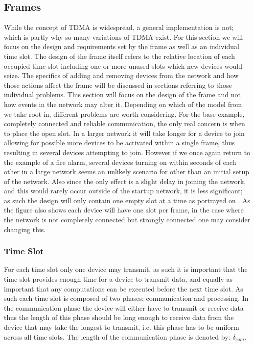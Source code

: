 \subsection{Frames}\label{GCRC:frame}
While the concept of TDMA is widespread, a general implementation is not; which is partly why so many variations of TDMA exist.
For this section we will focus on the design and requirements set by the frame as well as an individual time slot.
The design of the frame itself refers to the relative location of each occupied time slot including one or more unused slots which new devices would seize.
The specifics of adding and removing devices from the network and how those actions affect the frame will be discussed in sections referring to those individual problems.
This section will focus on the design of the frame and not how events in the network may alter it.
Depending on which of the model from  we take root in, different problems are worth considering.
For the base example, completely connected and reliable communication, the only real concern is when to place the open slot.
In a larger network it will take longer for a device to join allowing for possible more devices to be activated within a single frame, thus resulting in several devices attempting to join.
However if we once again return to the example of a fire alarm, several devices turning on within seconds of each other in a large network seems an unlikely scenario for other than an initial setup of the network.
Also since the only effect is a slight delay in joining the network, and this would rarely occur outside of the startup network, it is less significant; as such the design will only contain one empty slot at a time as portrayed on .
As the figure also shows each device will have one slot per frame, in the case where the network is not completely connected but strongly connected one may consider changing this.


\subsubsection*{Time Slot}
For each time slot only one device may transmit, as such it is important that the time slot provides enough time for a device to transmit data, and equally as important that any computations can be executed before the next time slot.
As such each time slot is composed of two phases; communication and processing.
In the communication phase the device will either have to transmit or receive data thus the length of this phase should be long enough to receive data from the device that may take the longest to transmit, i.e. this phase has to be uniform across all time slots.
The length of the communication phase is denoted by: $\delta_{com}$.

